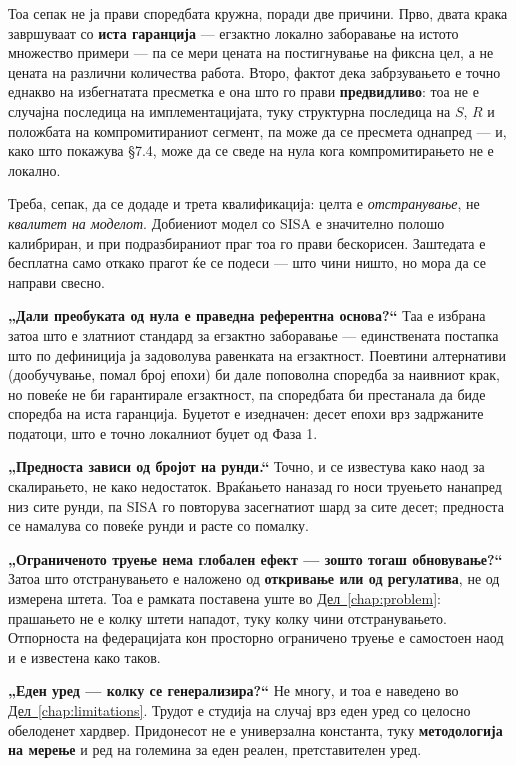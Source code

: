 Тоа сепак не ја прави споредбата кружна, поради две причини. Прво, двата крака завршуваат со
\textbf{иста гаранција} --- егзактно локално заборавање на истото множество примери --- па се мери
цената на постигнување на фиксна цел, а не цената на различни количества работа. Второ, фактот
дека забрзувањето е точно еднакво на избегнатата пресметка е она што го прави \textbf{предвидливо}:
тоа не е случајна последица на имплементацијата, туку структурна последица на $S$, $R$ и
положбата на компромитираниот сегмент, па може да се пресмета однапред --- и, како што покажува
§7.4, може да се сведе на нула кога компромитирањето не е локално.

Треба, сепак, да се додаде и трета квалификација: целта е \emph{отстранување}, не \emph{квалитет на
моделот}. Добиениот модел со SISA е значително полошо калибриран, и при подразбираниот праг
тоа го прави бескорисен. Заштедата е бесплатна само откако прагот ќе се подеси --- што чини
ништо, но мора да се направи свесно.

\textbf{„Дали преобуката од нула е праведна референтна основа?“} Таа е избрана затоа што е
златниот стандард за егзактно заборавање --- единствената постапка што по дефиниција ја
задоволува равенката на егзактност. Поевтини алтернативи (дообучување, помал број епохи) би
дале поповолна споредба за наивниот крак, но повеќе не би гарантирале егзактност, па
споредбата би престанала да биде споредба на иста гаранција. Буџетот е изедначен: десет
епохи врз задржаните податоци, што е точно локалниот буџет од Фаза 1.

\textbf{„Предноста зависи од бројот на рунди.“} Точно, и се известува како наод за скалирањето,
не како недостаток. Враќањето наназад го носи труењето нанапред низ сите рунди, па SISA го
повторува засегнатиот шард за сите десет; предноста се намалува со повеќе рунди и расте со
помалку.

\textbf{„Ограниченото труење нема глобален ефект --- зошто тогаш обновување?“} Затоа што
отстранувањето е наложено од \textbf{откривање или од регулатива}, не од измерена штета. Тоа е
рамката поставена уште во \hyperref[chap:problem]{Дел~\ref*{chap:problem}}: прашањето не е колку штети нападот, туку колку
чини отстранувањето. Отпорноста на федерацијата кон просторно ограничено труење е самостоен
наод и е известена како таков.

\textbf{„Еден уред --- колку се генерализира?“} Не многу, и тоа е наведено во \hyperref[chap:limitations]{Дел~\ref*{chap:limitations}}.
Трудот е студија на случај врз еден уред со целосно обелоденет хардвер. Придонесот не е
универзална константа, туку \textbf{методологија на мерење} и ред на големина за еден реален,
претставителен уред.

